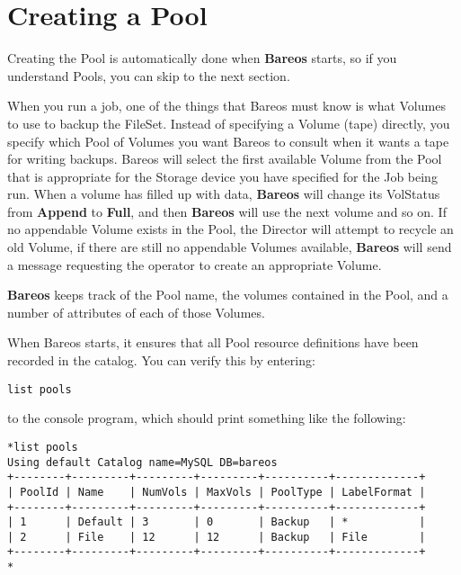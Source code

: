 \section{Creating a Pool}
\label{Pool}

Creating the Pool is automatically done when {\bf Bareos} starts, so if you
understand Pools, you can skip to the next section.

When you run a job, one of the things that Bareos must know is what Volumes to
use to backup the FileSet. Instead of specifying a Volume (tape) directly, you
specify which Pool of Volumes you want Bareos to consult when it wants a tape
for writing backups. Bareos will select the first available Volume from the
Pool that is appropriate for the Storage device you have specified for the Job
being run. When a volume has filled up with data, {\bf Bareos} will change its
VolStatus from {\bf Append} to {\bf Full}, and then {\bf Bareos} will use the
next volume and so on. If no appendable Volume exists in the Pool, the
Director will attempt to recycle an old Volume, if there are still no
appendable Volumes available, {\bf Bareos} will send a message requesting the
operator to create an appropriate Volume.

{\bf Bareos} keeps track of the Pool name, the volumes contained in the Pool,
and a number of attributes of each of those Volumes.

When Bareos starts, it ensures that all Pool resource definitions have been
recorded in the catalog. You can verify this by entering:

\footnotesize
\begin{verbatim}
list pools
\end{verbatim}
\normalsize

to the console program, which should print something like the following:

\footnotesize
\begin{verbatim}
*list pools
Using default Catalog name=MySQL DB=bareos
+--------+---------+---------+---------+----------+-------------+
| PoolId | Name    | NumVols | MaxVols | PoolType | LabelFormat |
+--------+---------+---------+---------+----------+-------------+
| 1      | Default | 3       | 0       | Backup   | *           |
| 2      | File    | 12      | 12      | Backup   | File        |
+--------+---------+---------+---------+----------+-------------+
*
\end{verbatim}
\normalsize

